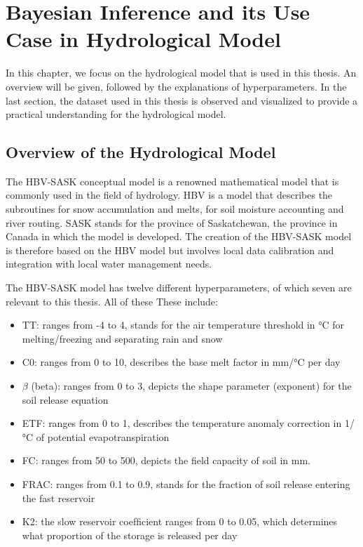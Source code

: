 \chapter{Bayesian Inference and its Use Case in Hydrological Model}

In this chapter, we focus on the hydrological model that is used in this thesis. An overview will be given, followed by the explanations of hyperparameters. In the last section, the dataset used in this thesis is observed and visualized to provide a practical understanding for the hydrological model.


\section{Overview of the Hydrological Model}
The HBV-SASK conceptual model is a renowned mathematical model that is commonly used in the field of hydrology. HBV is a model that describes the subroutines for snow accumulation and melts, for soil moisture accounting and river routing.\cite{hbv} SASK stands for the province of Saskatchewan, the province in Canada in which the model is developed. The creation of the HBV-SASK model is therefore based on the HBV model but involves local data calibration and integration with local water management needs.\cite{sask}

The HBV-SASK model has twelve different hyperparameters, of which seven are relevant to this thesis.\cite{ivana_relevant_params} All of these These include:\cite{hydrology}

\begin{itemize}
  \item TT: ranges from -4 to 4, stands for the air temperature threshold in °C for melting/freezing and separating rain and snow
  \item C0: ranges from 0 to 10, describes the base melt factor in mm/°C per day
  \item $\beta$ (beta): ranges from 0 to 3, depicts the shape parameter (exponent) for the soil release equation
  \item ETF: ranges from 0 to 1, describes the temperature anomaly correction in 1/°C of potential evapotranspiration
  \item FC: ranges from 50 to 500, depicts the field capacity of soil in mm.
  \item FRAC: ranges from 0.1 to 0.9, stands for the fraction of soil release entering the fast reservoir
  \item K2: the slow reservoir coefﬁcient ranges from 0 to 0.05, which determines what proportion of the storage is released per day
\end{itemize}

